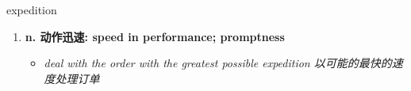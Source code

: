
\begin{frame}
{\huge expedition}
\begin{center}
\begin{enumerate}\Large
  \item \textbf{n. 动作迅速: speed in performance; promptness}
  \begin{itemize}
    \item \em{\Large{deal with the order with the greatest possible expedition 以可能的最快的速度处理订单}}
  \end{itemize}
\end{enumerate}
\end{center}
\end{frame}
